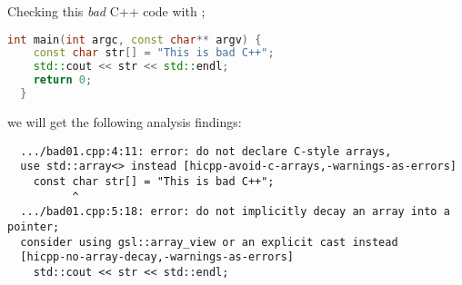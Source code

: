 \documentclass[compress,table,xcolor=table]{beamer}
\begin{document}
\begin{frame}[fragile]
  \Large
  Checking this {\em \larger bad} C++ code with ;
  \begin{lstlisting}[language=c++]
  int main(int argc, const char** argv) {
    const char str[] = "This is bad C++";
    std::cout << str << std::endl;
    return 0;
  }
  \end{lstlisting}
  we will get the following analysis findings:
  \footnotesize
  \begin{verbatim}
  .../bad01.cpp:4:11: error: do not declare C-style arrays,
  use std::array<> instead [hicpp-avoid-c-arrays,-warnings-as-errors]
    const char str[] = "This is bad C++";
          ^
  .../bad01.cpp:5:18: error: do not implicitly decay an array into a pointer;
  consider using gsl::array_view or an explicit cast instead
  [hicpp-no-array-decay,-warnings-as-errors]
    std::cout << str << std::endl;
  \end{verbatim}
\end{frame}
\end{document}
